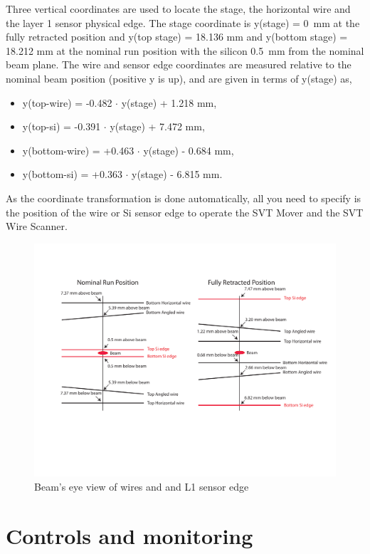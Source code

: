 \documentclass[12pt]{report}
\begin{document}
Three vertical coordinates are used to locate the stage, the horizontal wire and the layer 1 sensor physical edge. The stage coordinate is y(stage) = 0~mm at the fully retracted position and y(top stage) = 18.136 mm  and y(bottom stage) = 18.212 mm at the nominal run position with the silicon 0.5~mm from the nominal beam plane. The wire and sensor edge coordinates are measured relative to the nominal beam position (positive y is up), and are given in terms of y(stage) as,

\begin{itemize}
\item
y(top-wire) = -0.482 $\cdot$ y(stage) + 1.218 mm,
\item
y(top-si) = -0.391 $\cdot$ y(stage) + 7.472 mm,
\item
y(bottom-wire) = +0.463 $\cdot$ y(stage) - 0.684 mm,
\item
y(bottom-si) = +0.363 $\cdot$ y(stage) - 6.815 mm.
\end{itemize}

As the coordinate transformation is done automatically, all you need to specify is the position of the wire or Si sensor edge to operate the SVT Mover and the SVT Wire Scanner. 

\begin{figure}[ht!]
\centering
\includegraphics[width=15cm]{WireFrame2.pdf}
\caption{Beam's eye view of wires and and L1 sensor edge}
\label{fig:beam}
\end{figure}




\chapter{Controls and monitoring}
\end{document}

